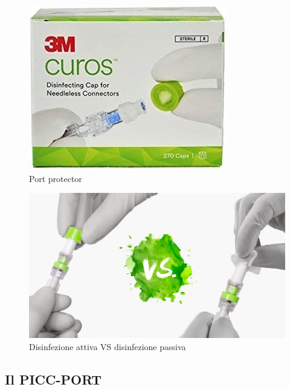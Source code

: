 \begin{figure}[H]
    \begin{center}
    \includegraphics[width=0.4\columnwidth]{img/portprotectors.jpg}
    \end{center}
    \caption{Port protector
    \cite{img47}}
    \label{fig:FIGURE_4.10}
\end{figure}

\begin{figure}[H]
    \begin{center}
    \includegraphics[width=0.6\columnwidth]{img/converted.png}
    \end{center}
    \caption{Disinfezione attiva VS disinfezione passiva
    \cite{img47BIS}}
    \label{fig:FIGURE_4.11}
\end{figure}

\subsection{Il PICC-PORT}

